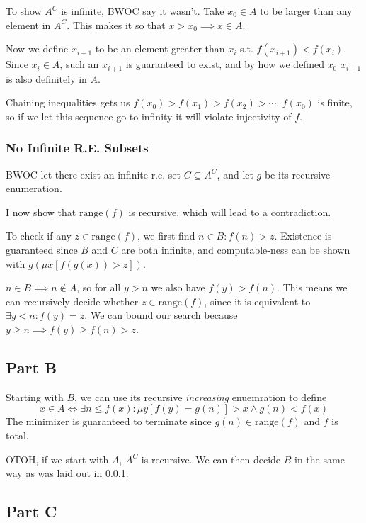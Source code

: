 \documentclass[12pt]{article}
\begin{document}
To show $A^C$ is infinite, BWOC say it wasn't.
Take $x_0 \in A$ to be larger than any element in $A^C$.
This makes it so that $x > x_0 \implies x \in A$.

Now we define $x_{i+1}$ to be an element greater than $x_i$ s.t. $f(x_{i+1}) < f(x_i)$.
Since $x_i \in A$, such an $x_{i+1}$ is guaranteed to exist,
and by how we defined $x_0$ $x_{i+1}$ is also definitely in $A$.

Chaining inequalities gets us $f(x_0) > f(x_1) > f(x_2) > \cdots$.
$f(x_0)$ is finite, so if we let this sequence go to infinity it will violate
injectivity of $f$.

\subsubsection{No Infinite R.E. Subsets}\label{sec:6a}

BWOC let there exist an infinite r.e. set $C \subseteq A^C$, and let $g$ be its recursive enumeration.

I now show that $\text{range}(f)$ is recursive, which will lead to a contradiction.

To check if any $z \in \text{range}(f)$, we first find $n \in B: f(n) > z$.
Existence is guaranteed since $B$ and $C$ are both infinite, and
computable-ness can be shown with $g(\mu x[f(g(x)) > z])$.

$n \in B \implies n \notin A$, so for all $y > n$ we also have $f(y) > f(n)$.
This means we can recursively decide whether $z \in \text{range}(f)$,
since it is equivalent to $\exists y < n: f(y)=z$.
We can bound our search because $y \ge n \implies f(y) \ge f(n) > z$.

\subsection{Part B}

Starting with $B$, we can use its recursive \textit{increasing} enuemration to define
\[x \in A \iff \exists n \le f(x): \mu y[f(y)=g(n)] > x \land g(n) < f(x)\]
The minimizer is guaranteed to terminate since $g(n) \in \text{range}(f)$ and $f$ is total.

OTOH, if we start with $A$, $A^C$ is recursive.
We can then decide $B$ in the same way as was laid out in \ref{sec:6a}.

\subsection{Part C}
\end{document}
